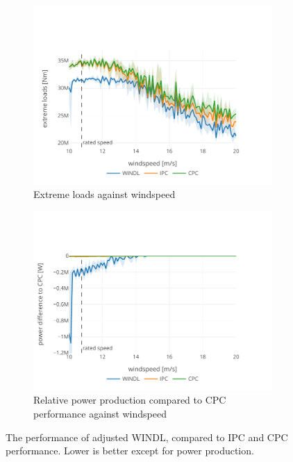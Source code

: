 \begin{figure}[hbt!]
\begin{subfigure}[b]{0.48\textwidth}
    \centering
    \includegraphics[width=\textwidth]{images/adjusted_bdelopt_extreme.pdf}
    \caption{Extreme loads against windspeed}
    \label{fig:adjusted-bdelopt-extreme}
  \end{subfigure}
  \begin{subfigure}[b]{0.48\textwidth}
      \centering
      \includegraphics[width=\textwidth]{images/adjusted_bdelopt_power.pdf}
      \caption{Relative power production compared to CPC performance against windspeed}
      \label{fig:adjusted-bdelopt-power}
  \end{subfigure}
  \caption{The performance of adjusted WINDL, compared to IPC and CPC performance. Lower is better except for power production.}
  \label{fig:adjusted-bdelopt}
\end{figure}

